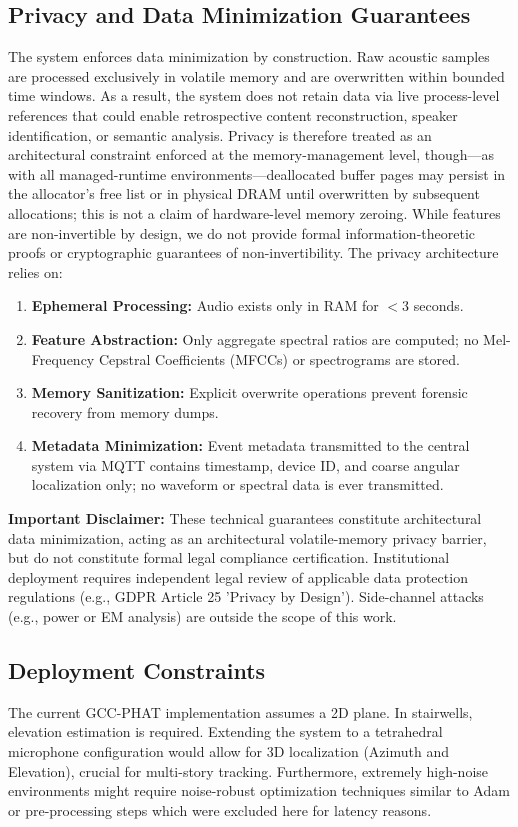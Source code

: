 \documentclass[conference]{IEEEtran}
\begin{document}
\subsection{Privacy and Data Minimization Guarantees}
The system enforces data minimization by construction. Raw acoustic samples are processed exclusively in volatile memory and are overwritten within bounded time windows. As a result, the system does not retain data via live process-level references that could enable retrospective content reconstruction, speaker identification, or semantic analysis. Privacy is therefore treated as an architectural constraint enforced at the memory-management level, though—as with all managed-runtime environments—deallocated buffer pages may persist in the allocator's free list or in physical DRAM until overwritten by subsequent allocations; this is not a claim of hardware-level memory zeroing. While features are non-invertible by design, we do not provide formal information-theoretic proofs or cryptographic guarantees of non-invertibility. The privacy architecture relies on:
\begin{enumerate}
    \item \textbf{Ephemeral Processing:} Audio exists only in RAM for $<$3 seconds.
    \item \textbf{Feature Abstraction:} Only aggregate spectral ratios are computed; no Mel-Frequency Cepstral Coefficients (MFCCs) or spectrograms are stored.
    \item \textbf{Memory Sanitization:} Explicit overwrite operations prevent forensic recovery from memory dumps.
    \item \textbf{Metadata Minimization:} Event metadata transmitted to the central system via MQTT contains timestamp, device ID, and coarse angular localization only; no waveform or spectral data is ever transmitted.
\end{enumerate}

\textbf{Important Disclaimer:} These technical guarantees constitute architectural data minimization, acting as an architectural volatile-memory privacy barrier, but do not constitute formal legal compliance certification. Institutional deployment requires independent legal review of applicable data protection regulations (e.g., GDPR Article 25 'Privacy by Design'). Side-channel attacks (e.g., power or EM analysis) are outside the scope of this work.

\subsection{Deployment Constraints}
The current GCC-PHAT implementation assumes a 2D plane. In stairwells, elevation estimation is required. Extending the system to a tetrahedral microphone configuration  would allow for 3D localization (Azimuth and Elevation), crucial for multi-story tracking. Furthermore, extremely high-noise environments might require noise-robust optimization techniques similar to Adam or pre-processing steps which were excluded here for latency reasons.
\end{document}
